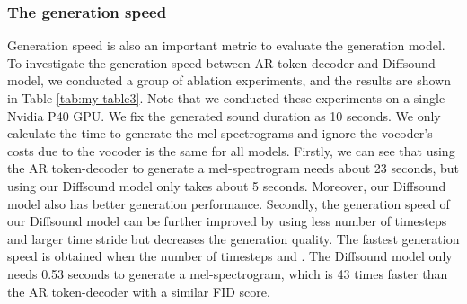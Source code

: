 \documentclass[lettersize,journal]{IEEEtran}
\begin{document}
\subsubsection{The generation speed}
Generation speed is also an important metric to evaluate the generation model. To investigate the generation speed between AR token-decoder and Diffsound model, we conducted a group of ablation experiments, and the results are shown in Table \ref{tab:my-table3}. Note that we conducted these experiments on a single Nvidia P40 GPU. We fix the generated sound duration as 10 seconds. {\color{black}We only calculate the time to generate the mel-spectrograms and ignore the vocoder's costs due to the vocoder is the same for all models.} Firstly, we can see that using the AR token-decoder to generate a mel-spectrogram needs about 23 seconds, but using our Diffsound model only takes about 5 seconds. Moreover, our Diffsound model also has better generation performance. Secondly, the generation speed of our Diffsound model can be further improved by using less number of timesteps  and larger time stride  but decreases the generation quality. The fastest generation speed is obtained when the number of timesteps  and . The Diffsound model only needs 0.53 seconds to generate a mel-spectrogram, which is 43 times faster than the AR token-decoder with a similar FID score. 
\end{document}
